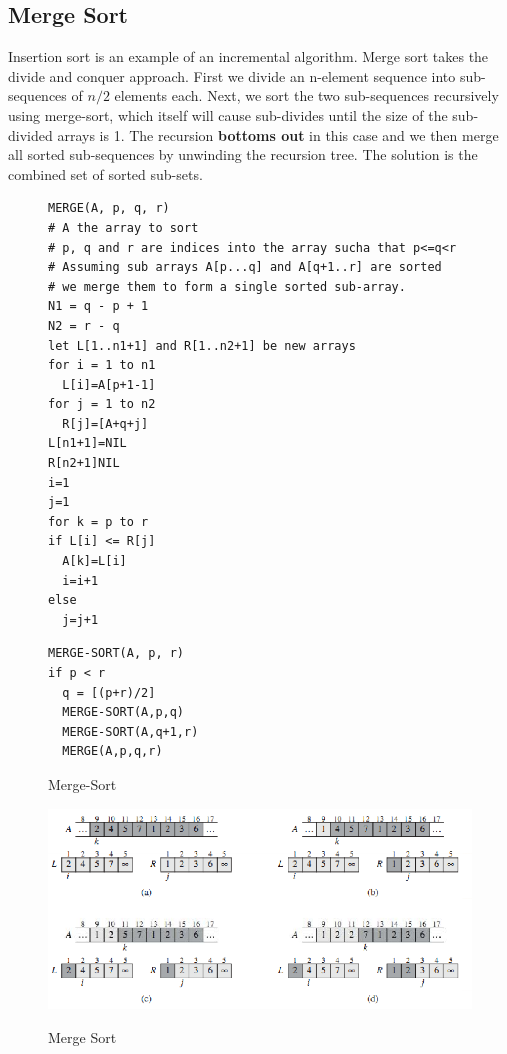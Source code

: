 \documentclass[10pt,a4paper]{article}
\begin{document}
\subsection{Merge Sort}
Insertion sort is an example of an incremental algorithm. Merge sort takes the divide and conquer approach. First we divide an n-element sequence into sub-sequences of $n/2$ elements each. Next, we sort the two sub-sequences recursively using merge-sort, which itself will cause sub-divides until the size of the sub-divided arrays is 1. The recursion {\bf bottoms out} in this case and we then merge all sorted sub-sequences by unwinding the recursion tree. The solution is the combined set of sorted sub-sets. 
\begin{figure}
\caption{Merge-Sort}
\begin{center}
\begin{lstlisting}
MERGE(A, p, q, r)
# A the array to sort
# p, q and r are indices into the array sucha that p<=q<r
# Assuming sub arrays A[p...q] and A[q+1..r] are sorted
# we merge them to form a single sorted sub-array. 
N1 = q - p + 1
N2 = r - q
let L[1..n1+1] and R[1..n2+1] be new arrays
for i = 1 to n1
  L[i]=A[p+1-1]
for j = 1 to n2
  R[j]=[A+q+j]
L[n1+1]=NIL
R[n2+1]NIL
i=1
j=1
for k = p to r
if L[i] <= R[j]
  A[k]=L[i]
  i=i+1
else
  j=j+1
\end{lstlisting}
\begin{lstlisting}
MERGE-SORT(A, p, r)
if p < r
  q = [(p+r)/2]
  MERGE-SORT(A,p,q)
  MERGE-SORT(A,q+1,r)
  MERGE(A,p,q,r)
\end{lstlisting}
\label{mslisting}
\end{center}
\end{figure}
\begin{figure}
\caption{Merge Sort\cite{OSCONCEPTS}}
\begin{center}
\includegraphics[scale=0.5]{../images/mergesort.png}
\label{mergesort}
\end{center}
\end{figure}
\end{document}
